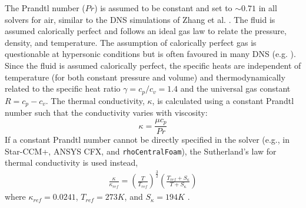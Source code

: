 \documentclass[journal ]{new-aiaa}
\begin{document}
The Prandtl number ($Pr$) is assumed to be constant and set to $\sim 0.71$ in all solvers for air, similar to the DNS simulations of Zhang et al. \cite{Zhang2018DNS}. The fluid is assumed calorically perfect and follows an ideal gas law to relate the pressure, density, and temperature. The  assumption of calorically perfect gas is questionable at hypersonic conditions but is often favoured in many DNS (e.g. \cite{Volpiani2018,Zhang2018DNS}). Since the fluid is assumed calorically perfect, the  specific heats are independent of temperature (for both constant pressure and volume) and thermodynamically related to the specific heat ratio $\gamma=c_p/c_v=1.4$ and the universal gas constant $R=c_p-c_v$. The thermal conductivity, $\kappa$, is calculated using a constant Prandtl number such that the conductivity varies with viscosity:
\begin{equation*}
    \kappa = \frac{\mu c_{p}}{Pr}
\end{equation*}
If a constant Prandtl number cannot be directly specified in the solver (e.g., in Star-CCM+, ANSYS CFX, and \texttt{rhoCentralFoam}), the Sutherland's law for thermal conductivity is used instead,
\begin{align}
    \frac{\kappa}{\kappa_{ref}} = \left(\frac{T}{T_{ref}} \right)^{\frac{3}{2}} \left(\frac{T_{ref} + S_{\kappa}}{T + S_{\kappa}} \right)
\end{align}
where $\kappa_{ref} = 0.0241$, $T_{ref} = 273 K$, and $S_{\kappa} = 194K$ \cite{White2006}. 


\end{document}
